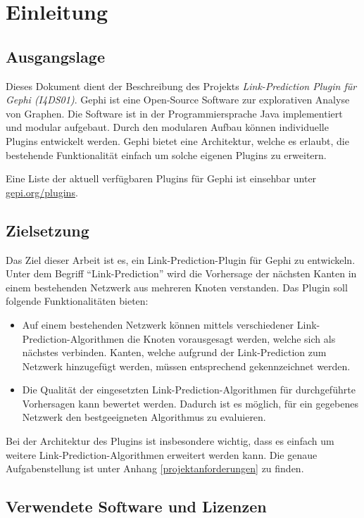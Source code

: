 \chapter{Einleitung}
\section{Ausgangslage}
Dieses Dokument dient der Beschreibung des Projekts \textit{Link-Prediction Plugin für Gephi (I4DS01)}.
Gephi ist eine Open-Source Software zur explorativen Analyse von Graphen. Die Software ist in der Programmiersprache Java implementiert und modular aufgebaut. Durch den modularen Aufbau können individuelle Plugins entwickelt werden. Gephi bietet eine Architektur, welche es erlaubt, die bestehende Funktionalität einfach um solche eigenen Plugins zu erweitern.

Eine Liste der aktuell verfügbaren Plugins für Gephi ist einsehbar unter \href{https://gephi.org/plugins}{gepi.org/plugins}.

\section{Zielsetzung}
Das Ziel dieser Arbeit ist es, ein Link-Prediction-Plugin für Gephi zu entwickeln. Unter dem Begriff ``Link-Prediction'' wird die Vorhersage der nächsten Kanten in einem bestehenden Netzwerk aus mehreren Knoten verstanden.
Das Plugin soll folgende Funktionalitäten bieten:

\begin{itemize}
    \item Auf einem bestehenden Netzwerk können mittels verschiedener Link-Prediction-Algorithmen die Knoten vorausgesagt werden, welche sich als nächstes verbinden. Kanten, welche aufgrund der Link-Prediction zum Netzwerk hinzugefügt werden, müssen entsprechend gekennzeichnet werden.
    \item Die Qualität der eingesetzten Link-Prediction-Algorithmen für durchgeführte Vorhersagen kann bewertet werden. Dadurch ist es möglich, für ein gegebenes Netzwerk den bestgeeigneten Algorithmus zu evaluieren.
\end{itemize}

Bei der Architektur des Plugins ist insbesondere wichtig, dass es einfach um weitere Link-Prediction-Algorithmen erweitert werden kann.
Die genaue Aufgabenstellung ist unter Anhang \ref{projektanforderungen} zu finden.

\section{Verwendete Software und Lizenzen}

